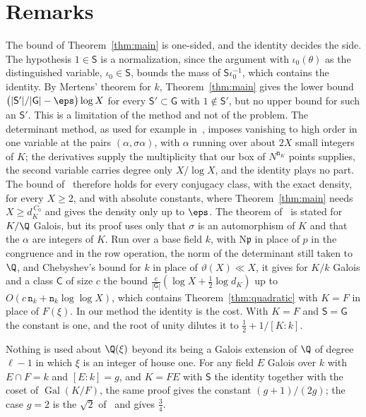 \documentclass[11pt, reqno, twoside, letterpaper]{amsart}
\DeclareMathOperator{\Gal}{Gal}
\newcommand{\Nm}{\mathrm{N}}
\newcommand{\fp}{\mathfrak{p}}
\newcommand{\dk}{{\mathtt{n}_k}}
\newcommand{\dK}{{\mathtt{n}_K}}
\newcommand{\auxp}{\ell}
\newcommand{\rou}{\xi}
\newcommand{\bxs}{N}
\newcommand{\expC}{C}
\newcommand{\XX}{X}
\newcommand{\galKk}{\mathsf{G}}
\newcommand{\Kf}{K}
\newcommand{\Sset}{\mathsf{S}}
\newcommand{\emb}{\iota}
\newcommand{\cls}{\mathsf{C}}
\begin{document}
\section{Remarks}\label{sec:remarks}

\begin{remark}\label{rem:compare}
The bound of Theorem~\ref{thm:main} is one-sided, and the identity
decides the side. The hypothesis $1\in\Sset$ is a normalization,
since the argument with $\emb_0(\theta)$ as the distinguished
variable, $\emb_0\in\Sset$, bounds the mass of $\Sset\emb_0^{-1}$,
which contains the identity. By Mertens' theorem for $k$,
Theorem~\ref{thm:main} gives the lower bound
$\big(|\Sset'|/|\galKk|-\eps\big)\log\XX$ for every
$\Sset'\subset\galKk$ with $1\notin\Sset'$, but no upper bound for
such an $\Sset'$. This is a limitation of the method and not of the
problem. The determinant method, as used for example in~\cite{Gr,Ko},
imposes vanishing to high order in one variable at the pairs
$(\alpha,\sigma\alpha)$, with $\alpha$ running over about $2\XX$ small
integers of $\Kf$; the derivatives supply the multiplicity that our
box of $\bxs^{\dK}$ points supplies, the second variable carries
degree only $\XX/\log\XX$, and the identity plays no part. The bound
of~\cite{Ko} therefore holds for every conjugacy class, with the exact
density, for every $\XX\ge 2$, and with absolute constants, where
Theorem~\ref{thm:main} needs $\XX\ge d_\Kf^{\,\expC_0}$ and gives the
density only up to $\eps$. The theorem of~\cite{Ko} is stated for
$\Kf/\Q$ Galois, but its proof uses only that $\sigma$ is an
automorphism of $\Kf$ and that the $\alpha$ are integers of $\Kf$. Run
over a base field $k$, with $\Nm\fp$ in place of $p$ in the congruence
and in the row operation, the norm of the determinant still taken to
$\Q$, and Chebyshev's bound for $k$ in place of
$\vartheta(\XX)\ll\XX$, it gives for $\Kf/k$ Galois and a class $\cls$
of size $c$ the bound $\frac{c}{|\galKk|}(\log\XX+\tfrac12\log d_\Kf)$
up to $O(c\,\dk+\dk\log\log\XX)$, which contains
Theorem~\ref{thm:quadratic} with $\Kf=F$ in place of $F(\rou)$. In our
method the identity is the cost. With $\Kf=F$ and $\Sset=\galKk$ the
constant is one, and the root of unity dilutes it to
$\tfrac12+1/[\Kf:k]$.
\end{remark}

\begin{remark}
Nothing is used about $\Q(\rou)$ beyond its being a Galois extension
of $\Q$ of degree $\auxp-1$ in which $\rou$ is an integer of house
one. For any field $E$ Galois over $k$ with $E\cap F=k$ and
$[E:k]=g$, and $\Kf=FE$ with $\Sset$ the identity together with the
coset of $\Gal(\Kf/F)$, the same proof gives the constant
$(g+1)/(2g)$; the case $g=2$ is the $\sqrt 2$ of~\cite{Ke} and gives
$\tfrac34$.
\end{remark}
\end{document}
